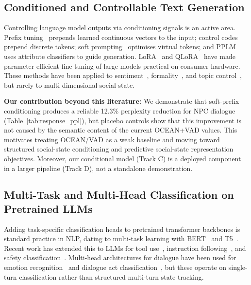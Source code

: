\documentclass[11pt]{article}
\begin{document}
\subsection{Conditioned and Controllable Text Generation}

Controlling language model outputs via conditioning signals is an active area.
Prefix tuning~\cite{li2021prefix} prepends learned continuous vectors to the input; control codes~\cite{keskar2019ctrl} prepend discrete tokens; soft prompting~\cite{lester2021power} optimises virtual tokens; and PPLM~\cite{dathathri2020plug} uses attribute classifiers to guide generation.
LoRA~\cite{hu2021lora} and QLoRA~\cite{dettmers2023qlora} have made parameter-efficient fine-tuning of large models practical on consumer hardware.
These methods have been applied to sentiment~\cite{dathathri2020plug}, formality~\cite{keskar2019ctrl}, and topic control~\cite{li2021prefix}, but rarely to multi-dimensional social state.

\textbf{Our contribution beyond this literature:}
We demonstrate that soft-prefix conditioning produces a reliable 12.3\% perplexity reduction for NPC dialogue (Table~\ref{tab:response_ppl}), but placebo controls show that this improvement is not caused by the semantic content of the current OCEAN+VAD values.
This motivates treating OCEAN/VAD as a weak baseline and moving toward structured social-state conditioning and predictive social-state representation objectives.
Moreover, our conditional model (Track C) is a deployed component in a larger pipeline (Track D), not a standalone demonstration.

\subsection{Multi-Task and Multi-Head Classification on Pretrained LLMs}

Adding task-specific classification heads to pretrained transformer backbones is standard practice in NLP, dating to multi-task learning with BERT~\cite{liu2019multi} and T5~\cite{raffel2020exploring}.
Recent work has extended this to LLMs for tool use~\cite{schick2023toolformer}, instruction following~\cite{wei2022finetuned}, and safety classification~\cite{bai2022training}.
Multi-head architectures for dialogue have been used for emotion recognition~\cite{li2021past} and dialogue act classification~\cite{raheja2019dialogue}, but these operate on single-turn classification rather than structured multi-turn state tracking.
\end{document}
